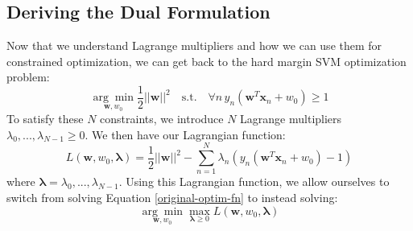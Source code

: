 \subsection{Deriving the Dual Formulation}
Now that we understand Lagrange multipliers and how we can use them for constrained optimization, we can get back to the hard margin SVM optimization problem:
\begin{equation} \label{original-optim-fn}
	\underset{\textbf{w}, w_{0}}{\arg\min} \frac{1}{2} ||\textbf{w}||^{2} \quad \text{s.t.} \quad \forall n \, y_{n}(\textbf{w}^{T}\textbf{x}_{n} + w_{0}) \geq 1
\end{equation}
To satisfy these $N$ constraints, we introduce $N$ Lagrange multipliers $\lambda_{0}, ..., \lambda_{N-1} \geq 0$. We then have our Lagrangian function:
\begin{equation} \label{lagrange-equation}
	L(\textbf{w}, w_{0}, \boldsymbol{\lambda}) = \frac{1}{2} ||\textbf{w}||^{2} - \sum_{n=1}^{N} \lambda_{n} (y_{n}(\textbf{w}^{T} \textbf{x}_{n} + w_{0}) - 1)
\end{equation}
where $\boldsymbol{\lambda} = \lambda_{0}, ..., \lambda_{N-1}$. Using this Lagrangian function, we allow ourselves to switch from solving Equation \ref{original-optim-fn} to instead solving:
\begin{equation} \label{new-optim-fn}
	\underset{\textbf{w}, w_{0}}{\arg\min} \max_{\boldsymbol{\lambda} \geq 0} L(\textbf{w}, w_{0}, \boldsymbol{\lambda})
\end{equation}


